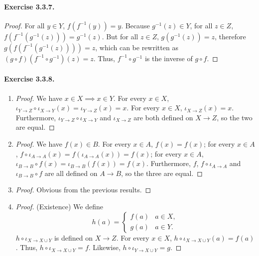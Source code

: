 \paragraph{Exercise 3.3.7.}
\begin{proof}
    For all $y\in Y$, $f(f^{-1}(y))=y$. Because $g^{-1}(z)\in Y$, for all $z\in Z$, $f(f^{-1}(g^{-1}(z)))=g^{-1}(z)$. But for all $z\in Z$, $g(g^{-1}(z))=z$, therefore $g(f(f^{-1}(g^{-1}(z))))=z$, which can be rewritten as $(g\circ f)(f^{-1}\circ g^{-1})(z)=z$. Thus, $f^{-1}\circ g^{-1}$ is the inverse of $g\circ f$.
\end{proof}

\paragraph{Exercise 3.3.8.}
\begin{enumerate}
    \item 
    \begin{proof}
        We have $x\in X \implies x\in Y$. For every $x\in X$, $\iota_{Y\to Z}\circ\iota_{X\to Y}(x)=\iota_{Y\to Z}(x)=x$. For every $x\in X$, $\iota_{X\to Z}(x)=x$. Furthermore, $\iota_{Y\to Z}\circ\iota_{X\to Y}$ and $\iota_{X\to Z}$ are both defined on $X\to Z$, so the two are equal.
    \end{proof}
    \item 
    \begin{proof}
        We have $f(x)\in B$. For every $x\in A$, $f(x)=f(x)$; for every $x\in A$, $f\circ \iota_{A\to A} (x) = f(\iota_{A\to A} (x)) = f(x) $; for every $x\in A$, $\iota_{B\to B} \circ f(x) = \iota_{B\to B}(f(x)) = f(x) $. Furthermore, $f$, $f\circ \iota_{A\to A}$ and $\iota_{B\to B} \circ f$ are all defined on $A\to B$, so the three are equal.
    \end{proof}
    \item 
    \begin{proof}
        Obvious from the previous results.
    \end{proof}
    \item 
    \begin{proof}
        (Existence) We define \[ h(a) = \begin{cases} f(a) & a\in X, \\ g(a) & a\in Y. \end{cases} \] $h\circ \iota_{X\to X\cup Y}$ is defined on $X\to Z$. For every $x\in X$, $h\circ \iota_{X\to X\cup Y}(a)=f(a)$. Thus, $h\circ \iota_{X\to X\cup Y}=f$. Likewise, $h\circ \iota_{Y\to X\cup Y}=g$.

\end{proof}
\end{enumerate}

